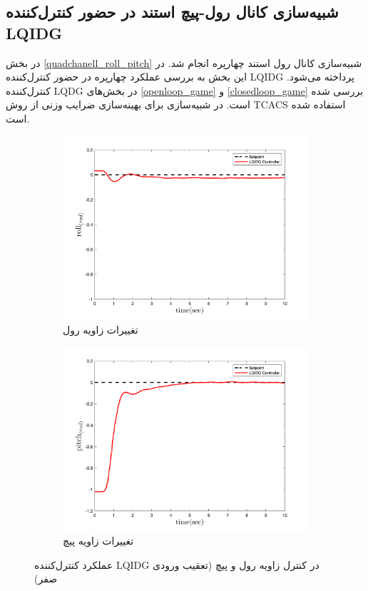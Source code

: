 \subsection{شبیه‌سازی کانال رول-پیچ استند در حضور کنترل‌کننده LQIDG}\label{roll_pitch_lqidg_section}
در بخش
\ref{quadchanell_roll_pitch}
شبیه‌سازی کانال رول استند چهارپره انجام شد. در این بخش به بررسی عملکرد چهارپره در حضور کنترل‌کننده LQIDG پرداخته می‌شود. کنترل‌کننده LQDG در بخش‌های
\ref{openloop_game}
و
\ref{closedloop_game}
بررسی شده است.
 در شبیه‌سازی برای بهینه‌سازی ضرایب وزنی از روش
TCACS \cite{Karimi2010}
استفاده شده است.
\begin{figure}
	\centering
	\begin{subfigure}
		\centering
		\includegraphics[width=12cm]{../Figures/Calibration/LQIDG/Roll_Pitch/lqidg_roll.png}
		\caption{تغییرات زاویه رول}
	\end{subfigure}%
	\begin{subfigure}
		\centering
		\includegraphics[width=12cm]{../Figures/Calibration/LQIDG/Roll_Pitch/lqidg_pitch.png}
		\caption{تغییرات زاویه پیچ}
	\end{subfigure}
	\caption{‫‪عملکرد کنترل‌کننده LQIDG در کنترل زاویه رول و پیچ (تعقیب ورودی صفر)}
\end{figure}


